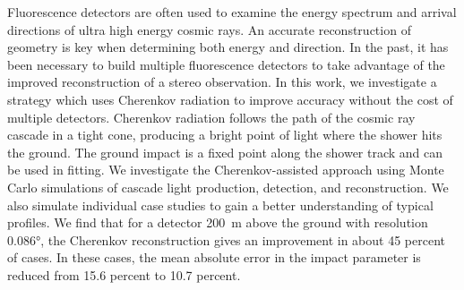 Fluorescence detectors are often used to examine the energy spectrum and arrival directions of ultra high energy cosmic rays. An accurate reconstruction of geometry is key when determining both energy and direction. In the past, it has been necessary to build multiple fluorescence detectors to take advantage of the improved reconstruction of a stereo observation. In this work, we investigate a strategy which uses Cherenkov radiation to improve accuracy without the cost of multiple detectors. Cherenkov radiation follows the path of the cosmic ray cascade in a tight cone, producing a bright point of light where the shower hits the ground. The ground impact is a fixed point along the shower track and can be used in fitting. We investigate the Cherenkov-assisted approach using Monte Carlo simulations of cascade light production, detection, and reconstruction. We also simulate individual case studies to gain a better understanding of typical profiles. We find that for a detector \SI{200}{m} above the ground with resolution \ang{0.086}, the Cherenkov reconstruction gives an improvement in about 45 percent of cases. In these cases, the mean absolute error in the impact parameter is reduced from 15.6 percent to 10.7 percent.